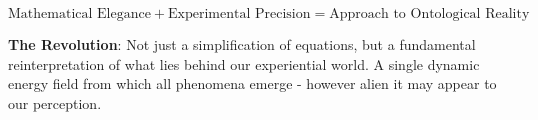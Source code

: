 \documentclass[12pt,a4paper]{article}
\begin{document}
	\begin{equation}
		\boxed{\text{Mathematical Elegance} + \text{Experimental Precision} = \text{Approach to Ontological Reality}}
	\end{equation}
	
	\textbf{The Revolution}: Not just a simplification of equations, but a fundamental reinterpretation of what lies behind our experiential world. A single dynamic energy field from which all phenomena emerge - however alien it may appear to our perception.
	
\end{document}
